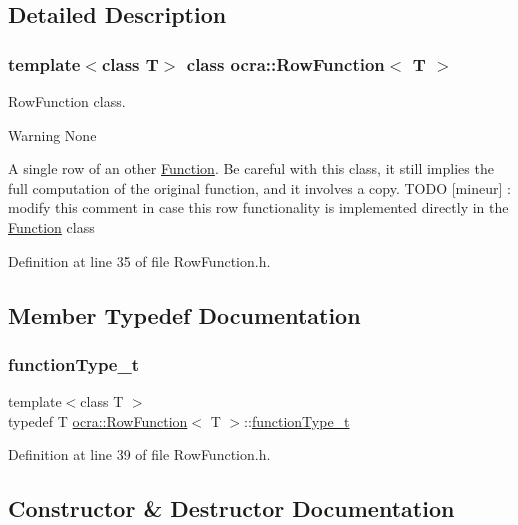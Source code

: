 \subsection{Detailed Description}
\subsubsection*{template$<$class T$>$\newline
class ocra\+::\+Row\+Function$<$ T $>$}

Row\+Function class. 

\begin{DoxyWarning}{Warning}
None
\end{DoxyWarning}
A single row of an other \hyperlink{classocra_1_1Function}{Function}. Be careful with this class, it still implies the full computation of the original function, and it involves a copy. T\+O\+DO \mbox{[}mineur\mbox{]} \+: modify this comment in case this row functionality is implemented directly in the \hyperlink{classocra_1_1Function}{Function} class 

Definition at line 35 of file Row\+Function.\+h.



\subsection{Member Typedef Documentation}
\hypertarget{classocra_1_1RowFunction_a4b6faf57022f367fdcff681c2dc98306}{}\label{classocra_1_1RowFunction_a4b6faf57022f367fdcff681c2dc98306} 
\subsubsection{\texorpdfstring{function\+Type\+\_\+t}{functionType\_t}}
{\footnotesize\ttfamily template$<$class T $>$ \\
typedef T \hyperlink{classocra_1_1RowFunction}{ocra\+::\+Row\+Function}$<$ T $>$\+::\hyperlink{classocra_1_1RowFunction_a4b6faf57022f367fdcff681c2dc98306}{function\+Type\+\_\+t}}



Definition at line 39 of file Row\+Function.\+h.



\subsection{Constructor \& Destructor Documentation}
\hypertarget{classocra_1_1RowFunction_aed18ba241ac62a2c8013593f424b60d5}{}\label{classocra_1_1RowFunction_aed18ba241ac62a2c8013593f424b60d5} 
